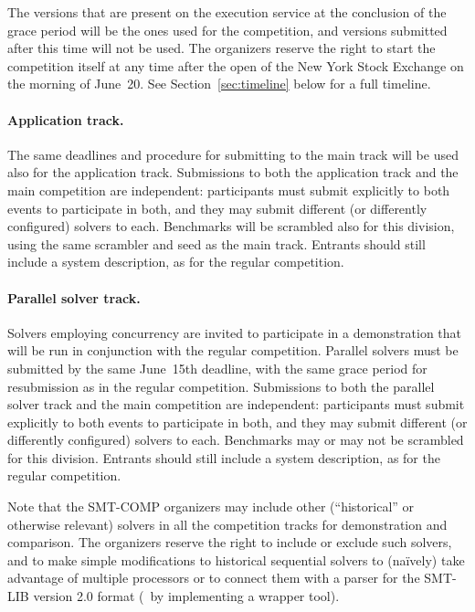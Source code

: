 \documentclass[12pt]{article}
\begin{document}
The versions that are present on the execution service at the conclusion of the
grace period will be the ones used for the competition, and versions
submitted after this time will not be used.  The organizers reserve
the right to start the competition itself at any time after the open
of the New York Stock Exchange on the morning of June~20.  See
Section~\ref{sec:timeline} below for a full timeline.

\paragraph{Application track.} %
The same deadlines and procedure for submitting to the main track will be used
also for the application track. Submissions to both the application track and
the main competition are independent: participants must submit explicitly to
both events to participate in both, and they may submit different (or
differently configured) solvers to each.  Benchmarks will be scrambled also
for this division, using the same scrambler and seed as the main track.
Entrants should still include a system description, as for the regular
competition.

\paragraph{Parallel solver track.} %
Solvers employing concurrency are invited to participate in a
demonstration that will be run in conjunction with the regular competition.
Parallel solvers must be submitted by the same June~15th deadline,
with the same grace period for resubmission as in the regular
competition.  Submissions to both the parallel solver track
and the main competition are independent: participants must submit
explicitly to both events to participate in both, and they may submit
different (or differently configured) solvers to each.  Benchmarks may
or may not be scrambled for this division.  Entrants should still
include a system description, as for the regular competition.

\medskip
\noindent
Note that the SMT-COMP organizers may include
other (``historical'' or otherwise relevant) solvers in all the competition tracks for
demonstration and comparison.  The organizers reserve the right to
include or exclude such solvers, and to make simple modifications
to historical sequential solvers to (na\"ively) take advantage of
multiple processors 
or to connect them with a parser for the SMT-LIB version 2.0 format
(\eg\ by implementing a wrapper tool).
\end{document}
